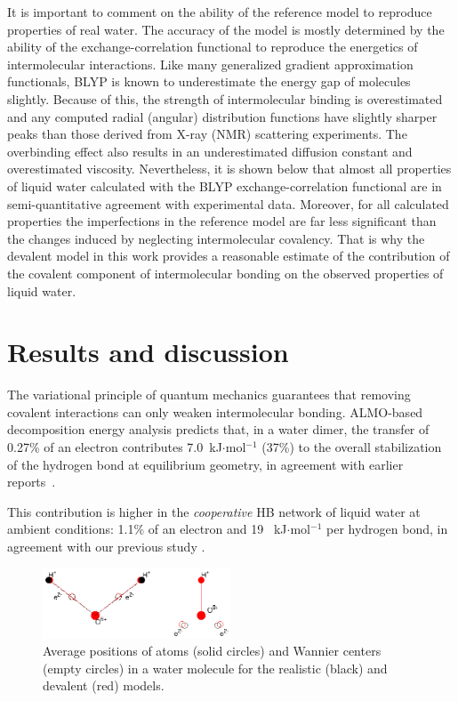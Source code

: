 \documentclass[journal=jacsat,manuscript=article]{achemso}
\begin{document}
It is important to comment on the ability of the reference model to reproduce properties of real water. 
The accuracy of the model is mostly determined by the ability of the exchange-correlation functional to reproduce the energetics of intermolecular interactions. Like many generalized gradient approximation functionals, BLYP is known to underestimate the energy gap of molecules slightly. 
Because of this, the strength of intermolecular binding is overestimated and any computed radial (angular) distribution functions have slightly sharper peaks than those derived from X-ray (NMR) scattering experiments. 
The overbinding effect also results in an underestimated diffusion constant and overestimated viscosity. 
Nevertheless, it is shown below that almost all properties of liquid water calculated with the BLYP exchange-correlation functional are in semi-quantitative agreement with experimental data. 
Moreover, for all calculated properties the imperfections in the reference model are far less significant than the changes induced by neglecting intermolecular covalency. 
That is why the devalent model in this work provides a reasonable estimate of the contribution of the covalent component of intermolecular bonding on the observed properties of liquid water.


\section{Results and discussion}

The variational principle of quantum mechanics guarantees that removing covalent interactions can only weaken intermolecular bonding. 
ALMO-based decomposition energy analysis predicts that, in a water dimer, the transfer of 0.27\% of an electron contributes  7.0~kJ$\cdot$mol$^{-1}$ (37\%) to the overall stabilization of the hydrogen bond at equilibrium geometry, in agreement with earlier reports~\cite{stevens1987frozen,chen1996energy,piquemal2005csov,khaliullin2009electron}. 

This contribution is higher in the \emph{cooperative} HB network of liquid water at ambient conditions: 1.1\% of an electron and 19 ~kJ$\cdot$mol$^{-1}$ per hydrogen bond, in agreement with our previous study \cite{kuhne2014nature}.

\begin{figure}
\includegraphics[width=0.5\textwidth]{acoord}
\caption{Average positions of atoms (solid circles) and Wannier centers (empty circles) in a water molecule for the realistic (black) and devalent (red) models. 
} \label{Fig:acoord}
\end{figure}
\end{document}
